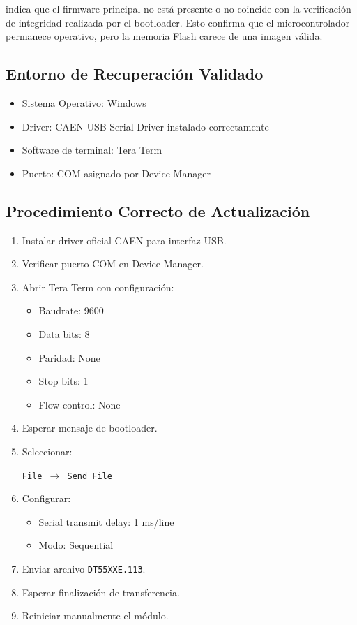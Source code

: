 \documentclass{article}
\begin{document}
indica que el firmware principal no está presente o no coincide con
la verificación de integridad realizada por el bootloader.
Esto confirma que el microcontrolador permanece operativo,
pero la memoria Flash carece de una imagen válida.


\subsection{Entorno de Recuperación Validado}

\begin{itemize}
    \item Sistema Operativo: Windows
    \item Driver: CAEN USB Serial Driver instalado correctamente
    \item Software de terminal: Tera Term
    \item Puerto: COM asignado por Device Manager
\end{itemize}

\subsection{Procedimiento Correcto de Actualización}

\begin{enumerate}
    \item Instalar driver oficial CAEN para interfaz USB.
    \item Verificar puerto COM en Device Manager.
    \item Abrir Tera Term con configuración:
    \begin{itemize}
        \item Baudrate: 9600
        \item Data bits: 8
        \item Paridad: None
        \item Stop bits: 1
        \item Flow control: None
    \end{itemize}
    \item Esperar mensaje de bootloader.
    \item Seleccionar:
    \begin{center}
    \texttt{File $\rightarrow$ Send File}
    \end{center}
    \item Configurar:
    \begin{itemize}
        \item Serial transmit delay: 1 ms/line
        \item Modo: Sequential
    \end{itemize}
    \item Enviar archivo \texttt{DT55XXE.113}.
    \item Esperar finalización de transferencia.
    \item Reiniciar manualmente el módulo.
\end{enumerate}
\end{document}
